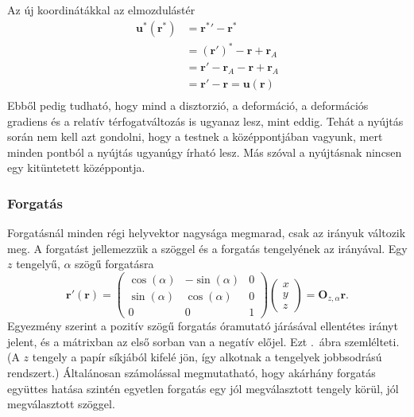 \documentclass[12pt,a4paper]{scrartcl}
\let\mathbf\bm
\begin{document}
Az új koordinátákkal az elmozdulástér
\[\begin{aligned}
  {{\mathbf{u}}^ * }\left( {{{\mathbf{r}}^ * }} \right) &  = {{\mathbf{r}}^ * }' - {{\mathbf{r}}^ * } \\ 
   &  = {\left( {{\mathbf{r}}'} \right)^ * } - {\mathbf{r}} + {{\mathbf{r}}_A} \\ 
   &  = {\mathbf{r}}' - {{\mathbf{r}}_A} - {\mathbf{r}} + {{\mathbf{r}}_A} \\ 
   &  = {\mathbf{r}}' - {\mathbf{r}} = {\mathbf{u}}\left( {\mathbf{r}} \right) \\ 
\end{aligned} \]
Ebből pedig tudható, hogy mind a disztorzió, a deformáció, a deformációs gradiens és a relatív térfogatváltozás is ugyanaz lesz, mint eddig. Tehát a nyújtás során nem kell azt gondolni, hogy a testnek a középpontjában vagyunk, mert minden pontból a nyújtás ugyanúgy írható lesz. Más szóval a nyújtásnak nincsen egy kitüntetett középpontja.
\normalsize

\subsubsection{Forgatás} \label{section:forgatas}
Forgatásnál minden régi helyvektor nagysága megmarad, csak az irányuk változik meg. A forgatást jellemezzük a szöggel és a forgatás tengelyének az irányával. Egy $z$ tengelyű, $\alpha$ szögű forgatásra
\[{\mathbf{r}}'\left( {\mathbf{r}} \right) = \left( {\begin{array}{*{20}{c}}
  {\cos \left( \alpha  \right)}&{ - \sin \left( \alpha  \right)}&0 \\ 
  { \sin \left( \alpha  \right)}&{\cos \left( \alpha  \right)}&0 \\ 
  0&0&1 
\end{array}} \right)\left( {\begin{array}{*{20}{c}}
  x \\ 
  y \\ 
  z 
\end{array}} \right) = {{\mathbf{O}}_{z,\alpha }}{\mathbf{r}}.\]
Egyezmény szerint a pozitív szögű forgatás óramutató járásával ellentétes irányt jelent, és a mátrixban az első sorban van a negatív előjel. Ezt \az{\ref{fig:forgat}}.\ ábra szemlélteti. (A $z$ tengely a papír síkjából kifelé jön, így alkotnak a tengelyek jobbsodrású rendszert.) Általánosan számolással megmutatható, hogy akárhány forgatás együttes hatása szintén egyetlen forgatás egy jól megválasztott tengely körül, jól megválasztott szöggel.
\end{document}

